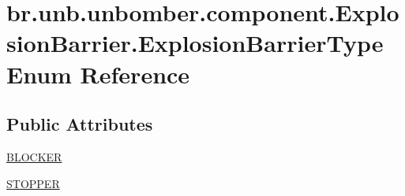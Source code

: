 \hypertarget{enumbr_1_1unb_1_1unbomber_1_1component_1_1_explosion_barrier_1_1_explosion_barrier_type}{\section{br.\+unb.\+unbomber.\+component.\+Explosion\+Barrier.\+Explosion\+Barrier\+Type Enum Reference}
\label{enumbr_1_1unb_1_1unbomber_1_1component_1_1_explosion_barrier_1_1_explosion_barrier_type}
}
\subsection*{Public Attributes}
\begin{DoxyCompactItemize}
\item 
\hyperlink{enumbr_1_1unb_1_1unbomber_1_1component_1_1_explosion_barrier_1_1_explosion_barrier_type_adb66bff5cf3328d1e6ed12c8a1a27d3b}{B\+L\+O\+C\+K\+E\+R}
\item 
\hyperlink{enumbr_1_1unb_1_1unbomber_1_1component_1_1_explosion_barrier_1_1_explosion_barrier_type_a40f15f4d270a8ca650a48e8e44faa16a}{S\+T\+O\+P\+P\+E\+R}
\end{DoxyCompactItemize}


